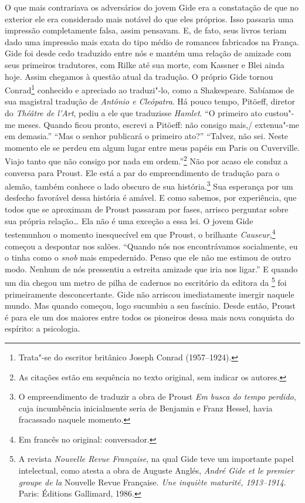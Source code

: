 O que mais contrariava os adversários do jovem Gide era a constatação de
que no exterior ele era considerado mais notável do que eles próprios.
Isso passaria uma impressão completamente falsa, assim pensavam.
E, de fato, seus livros teriam dado uma impressão mais exata do tipo médio de romances fabricados na França. Gide foi
desde cedo traduzido entre nós e mantém uma relação de amizade com seus
primeiros tradutores, com Rilke até sua morte, com Kassner e Blei ainda
hoje. Assim chegamos à questão atual da tradução. O próprio Gide
tornou Conrad\footnote{Trata"-se do escritor britânico Joseph
  Conrad (1957--1924). \versal{[N.~O.]}} conhecido e apreciado ao traduzi"-lo, como a Shakespeare. Sabíamos de sua magistral tradução de
\emph{Antônio e Cleópatra}. Há pouco tempo, Pitöeff, diretor do
\emph{Théâtre de l'Art}, pediu a ele que traduzisse \emph{Hamlet}.
``O primeiro ato custou"-me meses. Quando ficou pronto, escrevi a
Pitöeff: não consigo mais,/ extenua"-me em demasia.'' ``Mas o senhor
publicará o primeiro ato?'' ``Talvez, não sei. Neste momento ele se
perdeu em algum lugar entre meus papéis em Paris ou Cuverville. Viajo
tanto que não consigo por nada em ordem.''\footnote{As citações
  estão em sequência no texto original, sem indicar os autores. \versal{[N.~T.]}} Não por acaso ele conduz a conversa para Proust. Ele está a
par do empreendimento de tradução para o alemão, também conhece o lado
obscuro de sua história.\footnote{O empreendimento de traduzir a
  obra de Proust \emph{Em busca do tempo perdido}, cuja incumbência
  inicialmente seria de Benjamin e Franz Hessel, havia fracassado
  naquele momento. \versal{[N.~T.]}} Sua esperança por um desfecho
favorável dessa história é amável. E como sabemos, por experiência, que todos
que se aproximam de Proust passaram por fases, arrisco
perguntar sobre sua própria relação\ldots{} Ela não é uma exceção a essa lei.
O jovem Gide testemunhou o momento inesquecível em que Proust, o
brilhante \emph{Causeur},\footnote{Em francês no original: conversador. \versal{[N.~T.]}} começou
a despontar nos salões. ``Quando nós nos encontrávamos socialmente, eu o
tinha como o \emph{snob} mais empedernido. Penso que ele não me
estimou de outro modo. Nenhum de nós pressentiu a estreita amizade que
iria nos ligar.'' E quando um dia chegou um metro de pilha de cadernos
no escritório da editora da \footnote{A revista
  \emph{Nouvelle Revue Française}, na qual Gide teve um importante papel
  intelectual, como atesta a obra de Auguste Anglés, \emph{André Gide et
  le premier groupe de la} Nouvelle Revue Française. \emph{Une inquiète
  maturité, 1913--1914}. Paris: Éditions Gallimard, 1986. \versal{[N.~T.]}} foi
primeiramente desconcertante. Gide não arriscou imediatamente imergir
naquele mundo. Mas quando começou, logo sucumbiu a seu fascínio. Desde
então, Proust é para ele um dos maiores entre todos os pioneiros dessa
mais nova conquista do espírito: a psicologia.

